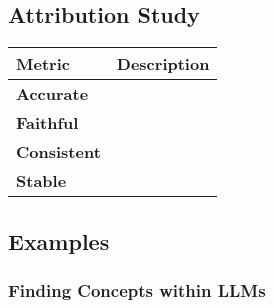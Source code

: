 \subsection{Attribution Study}
\begin{summary}
    \begin{center}
        \begin{tabular}{ll}
            \toprule
            \textbf{Metric} & \textbf{Description} \\
            \midrule
            \textbf{Accurate} & \\
            \midrule
            \textbf{Faithful} & \\
            \midrule
            \textbf{Consistent} & \\
            \midrule
            \textbf{Stable} & \\
        \end{tabular}
    \end{center}    
\end{summary}

\begin{summary}
\end{summary}

\subsection{Examples}
\subsubsection{Finding Concepts within LLMs}
\begin{example}
    
\end{example}
